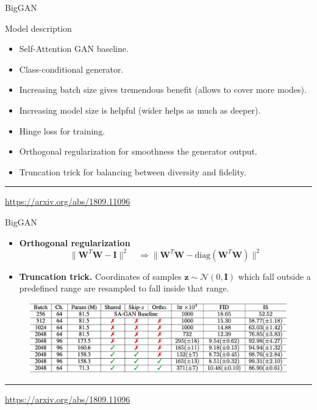 \documentclass{beamer}
\newcommand{\bz}{\mathbf{z}}
\newcommand{\bI}{\mathbf{I}}
\newcommand{\bW}{\mathbf{W}}
\newcommand{\cN}{\mathcal{N}}
\begin{document}
\begin{frame}{BigGAN}
	\begin{block}{Model description}
		\begin{itemize}
			\item Self-Attention GAN baseline.
			\item Class-conditional generator.
			\item Increasing batch size gives tremendous benefit (allows to cover more modes).
			\item Increasing model size is helpful (wider helps as much as deeper).
			\item Hinge loss for training.
			\item Orthogonal regularization for smoothness the generator output.
			\item Truncation trick for balancing between diversity and fidelity.
		\end{itemize}
	\end{block}
	\vspace{0.5cm}

	\vfill
	\hrule\medskip 
	{\scriptsize \href{https://arxiv.org/abs/1809.11096}{https://arxiv.org/abs/1809.11096}}
\end{frame}
\begin{frame}{BigGAN}
	\begin{itemize}
		\item \textbf{Orthogonal regularization}
		\[
		\| \bW^T \bW - \bI \|^2 \quad \Rightarrow \| \bW^T \bW - \text{diag}(\bW^T \bW) \|^2
		\]
		\item \textbf{Truncation trick.} Coordinates of samples $\bz \sim \cN(0, \bI)$ which fall outside a predefined range are resampled to fall inside that range.
	\end{itemize}
	\begin{figure}
		\centering
		\includegraphics[width=\linewidth]{figs/biggan_results}
	\end{figure}
	\vfill
	\hrule\medskip 
	{\scriptsize \href{https://arxiv.org/abs/1809.11096}{https://arxiv.org/abs/1809.11096}}
\end{frame}
\end{document}
